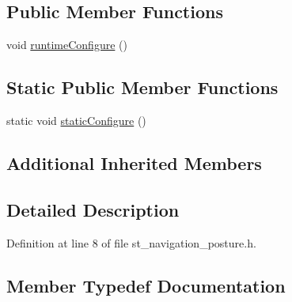 \subsection*{Public Member Functions}
\begin{DoxyCompactItemize}
\item 
void \hyperlink{structsm__fetch__two__table__pick__n__place__1_1_1pick__states_1_1StNavigationPosture_a518a39cd5d1a0c7c8fefac7a62a98e82}{runtime\+Configure} ()
\end{DoxyCompactItemize}
\subsection*{Static Public Member Functions}
\begin{DoxyCompactItemize}
\item 
static void \hyperlink{structsm__fetch__two__table__pick__n__place__1_1_1pick__states_1_1StNavigationPosture_a7a5208f7c8a4379f7e3a5cdac8606d8c}{static\+Configure} ()
\end{DoxyCompactItemize}
\subsection*{Additional Inherited Members}


\subsection{Detailed Description}


Definition at line 8 of file st\+\_\+navigation\+\_\+posture.\+h.



\subsection{Member Typedef Documentation}
\mbox{\label{structsm__fetch__two__table__pick__n__place__1_1_1pick__states_1_1StNavigationPosture_a1ed2aca740ca1806a83b8cb8cf0e80ea}} 

